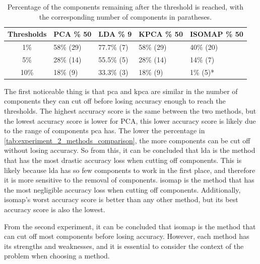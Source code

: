 \begin{table}[htb!]
    \centering
    \begin{tabular}{cp{}p{}p{}p{}}
        \toprule
        \textbf{Thresholds} & \textbf{PCA \% 50} & \textbf{LDA \% 9} & \textbf{KPCA \% 50} & \textbf{ISOMAP \% 50} \\ \midrule
        1\% & 58\% (29) & 77.7\% (7) & 58\% (29) & 40\% (20) \\
        5\% & 28\% (14) & 55.5\% (5) & 28\% (14) & 14\% (7) \\
        10\% & 18\% (9) & 33.3\% (3) & 18\% (9) & 1\% (5)* \\
        \bottomrule
    \end{tabular}
    \caption{Percentage of the components remaining after the threshold is reached, with the corresponding number of components in paratheses.}
    \label{tab:experiment_2_methods_comparison}
\end{table}

The first noticeable thing is that \gls{pca} and \gls{kpca} are similar in the number of components they can cut off before losing accuracy enough to reach the thresholds. The highest accuracy score is the same between the two methods, but the lowest accuracy score is lower for PCA, this lower accuracy score is likely due to the range of components \gls{pca} has.  The lower the percentage in \autoref{tab:experiment_2_methods_comparison}, the more components can be cut off without losing accuracy. So from this, it can be concluded that \gls{lda} is the method that has the most drastic accuracy loss when cutting off components. This is likely because \gls{lda} has so few components to work in the first place, and therefore it is more sensitive to the removal of components. \gls{isomap} is the method that has the most negligible accuracy loss when cutting off components. Additionally, \gls{isomap}'s worst accuracy score is better than any other method, but its best accuracy score is also the lowest. 

From the second experiment, it can be concluded that \gls{isomap} is the method that can cut off most components before losing accuracy. However, each method has its strengths and weaknesses, and it is essential to consider the context of the problem when choosing a method.



